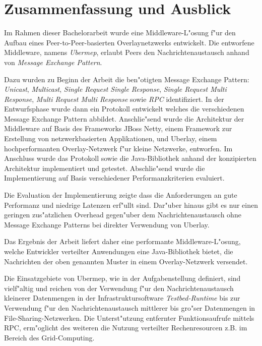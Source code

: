 \chapter{Zusammenfassung und Ausblick}
\label{cha:zusammenfassung}

Im Rahmen dieser Bachelorarbeit wurde eine Middleware-L"osung f"ur den Aufbau eines Peer-to-Peer-basierten Overlaynetzwerks entwickelt. Die entworfene Middleware, namens \emph{Ubermep}, erlaubt Peers den Nachrichtenaustausch anhand von \emph{Message Exchange Pattern}.

Dazu wurden zu Beginn der Arbeit die ben"otigten Message Exchange Pattern: \emph{Unicast}, \emph{Multicast}, \emph{Single Request Single Response}, \emph{Single Request Multi Response}, \emph{Multi Request Multi Response} sowie \emph{RPC} identifiziert. In der Entwurfsphase wurde dann ein Protokoll entwickelt welches die verschiedenen Message Exchange Pattern abbildet. Anschlie"send wurde die Architektur der Middleware auf Basis des Frameworks JBoss Netty, einem Framework zur Erstellung von netzwerkbasierten Applikationen, und Uberlay, einem hochperformanten Overlay-Netzwerk f"ur kleine Netzwerke, entworfen. Im Anschluss wurde das Protokoll sowie die Java-Bibliothek anhand der konzipierten Architektur implementiert und getestet. Abschlie"send wurde die Implementierung auf Basis verschiedener Performanzkriterien evaluiert.

Die Evaluation der Implementierung zeigte dass die Anforderungen an gute Performanz und niedrige Latenzen erf"ullt sind. Dar"uber hinaus gibt es nur einen geringen zus"atzlichen Overhead gegen"uber dem Nachrichtenaustausch ohne Message Exchange Patterns bei direkter Verwendung von Uberlay.

Das Ergebnis der Arbeit liefert daher eine performante Middleware-L"osung, welche Entwickler verteilter Anwendungen eine Java-Bibliothek bietet, die Nachrichten der oben genannten Muster in einem Overlay-Netzwerk versendet.

Die Einsatzgebiete von Ubermep, wie in der Aufgabenstellung definiert, sind vielf"altig und reichen von der Verwendung f"ur den Nachrichtenaustausch kleinerer Datenmengen in der Infrastruktursoftware \emph{Testbed-Runtime} bis zur Verwendung f"ur den Nachrichtenaustausch mittlerer bis gro"ser Datenmengen in File-Sharing-Netzwerken. Die Unterst"utzung entfernter Funktionsaufrufe mittels RPC, erm"oglicht des weiteren die Nutzung verteilter Rechenresourcen z.B. im Bereich des Grid-Computing.

